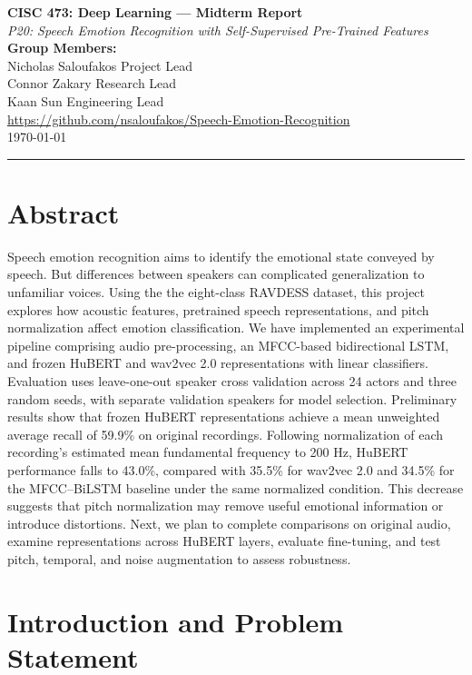 \documentclass[11pt, letterpaper]{article}
\begin{document}
{\centering
  {\Large\textbf{CISC 473: Deep Learning --- Midterm Report}}\\[0.5em]
  {\large\textit{P20: Speech Emotion Recognition with Self-Supervised Pre-Trained Features}}\\[0.4em]
  \textbf{Group Members:}\\{}
  Nicholas Saloufakos  \quad Project Lead\\{}
  Connor Zakary  \quad Research Lead \\{}
  Kaan Sun  \quad Engineering Lead \\{}
  \url{https://github.com/nsaloufakos/Speech-Emotion-Recognition}\\[0.3em]
  \today\\[0.4em]
  \rule{\linewidth}{0.4pt}
}

\section{Abstract}

Speech emotion recognition aims to identify the emotional state conveyed by speech. But differences between speakers can complicated generalization to unfamiliar voices. Using the the eight-class RAVDESS dataset, this project explores how acoustic features, pretrained speech representations, and pitch normalization affect emotion classification. We have implemented an experimental pipeline comprising audio pre-processing, an MFCC-based bidirectional LSTM, and frozen HuBERT and wav2vec 2.0 representations with linear classifiers. Evaluation uses leave-one-out speaker cross validation across 24 actors and three random seeds, with separate validation speakers for model selection. Preliminary results show that frozen HuBERT representations achieve a mean unweighted average recall of 59.9\% on original recordings. Following normalization of each recording’s estimated mean fundamental frequency to 200 Hz, HuBERT performance falls to 43.0\%, compared with 35.5\% for wav2vec 2.0 and 34.5\% for the MFCC–BiLSTM baseline under the same normalized condition. This decrease suggests that pitch normalization may remove useful emotional information or introduce distortions. Next, we plan to complete comparisons on original audio, examine representations across HuBERT layers, evaluate fine-tuning, and test pitch, temporal, and noise augmentation to assess robustness.

\section{Introduction and Problem Statement}
\end{document}
